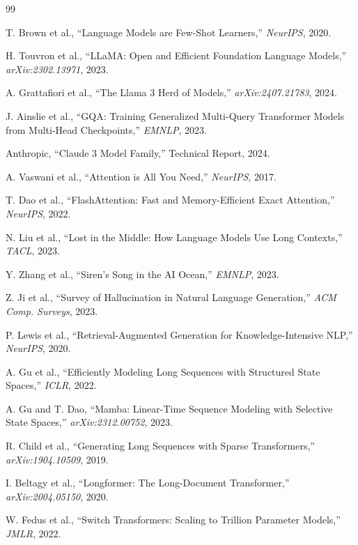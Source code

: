 \documentclass{article}
\begin{document}
\begin{thebibliography}{99}

T. Brown et al., ``Language Models are Few-Shot Learners,'' \textit{NeurIPS}, 2020.

H. Touvron et al., ``LLaMA: Open and Efficient Foundation Language Models,'' \textit{arXiv:2302.13971}, 2023.

A. Grattafiori et al., ``The Llama 3 Herd of Models,'' \textit{arXiv:2407.21783}, 2024.

J. Ainslie et al., ``GQA: Training Generalized Multi-Query Transformer Models from Multi-Head Checkpoints,'' \textit{EMNLP}, 2023.

Anthropic, ``Claude 3 Model Family,'' Technical Report, 2024.

A. Vaswani et al., ``Attention is All You Need,'' \textit{NeurIPS}, 2017.

T. Dao et al., ``FlashAttention: Fast and Memory-Efficient Exact Attention,'' \textit{NeurIPS}, 2022.

N. Liu et al., ``Lost in the Middle: How Language Models Use Long Contexts,'' \textit{TACL}, 2023.

Y. Zhang et al., ``Siren's Song in the AI Ocean,'' \textit{EMNLP}, 2023.

Z. Ji et al., ``Survey of Hallucination in Natural Language Generation,'' \textit{ACM Comp. Surveys}, 2023.

P. Lewis et al., ``Retrieval-Augmented Generation for Knowledge-Intensive NLP,'' \textit{NeurIPS}, 2020.

A. Gu et al., ``Efficiently Modeling Long Sequences with Structured State Spaces,'' \textit{ICLR}, 2022.

A. Gu and T. Dao, ``Mamba: Linear-Time Sequence Modeling with Selective State Spaces,'' \textit{arXiv:2312.00752}, 2023.

R. Child et al., ``Generating Long Sequences with Sparse Transformers,'' \textit{arXiv:1904.10509}, 2019.

I. Beltagy et al., ``Longformer: The Long-Document Transformer,'' \textit{arXiv:2004.05150}, 2020.

W. Fedus et al., ``Switch Transformers: Scaling to Trillion Parameter Models,'' \textit{JMLR}, 2022.


\end{thebibliography}
\end{document}
